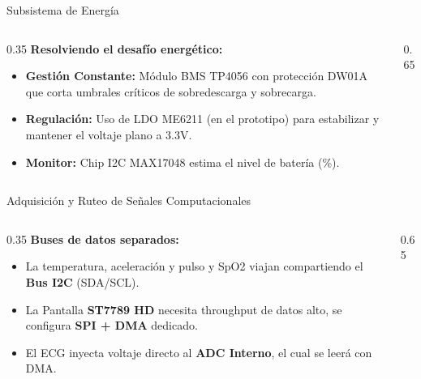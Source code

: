 \documentclass[aspectratio=169, 10pt]{beamer}
\begin{document}
\begin{frame}{Subsistema de Energía}
    \begin{columns}[c]
        \begin{column}{0.35\textwidth}
            \textbf{Resolviendo el desafío energético:}
            \begin{itemize}
                \item \textbf{Gestión Constante:} Módulo BMS TP4056 con protección DW01A que corta umbrales críticos de sobredescarga y sobrecarga.
                \item \textbf{Regulación:} Uso de LDO ME6211 (en el prototipo) para estabilizar y mantener el voltaje plano a 3.3V.
                \item \textbf{Monitor:} Chip I2C MAX17048 estima el nivel de batería (\%).
            \end{itemize}
        \end{column}
        \begin{column}{0.65\textwidth}
            \resizebox{\linewidth}{!}{}
        \end{column}
    \end{columns}
\end{frame}

\begin{frame}{Adquisición y Ruteo de Señales Computacionales}
    \begin{columns}[c]
        \begin{column}{0.35\textwidth}
            \textbf{Buses de datos separados:}
            \begin{itemize}
                \item La temperatura, aceleración y pulso y SpO2 viajan compartiendo el \textbf{Bus I2C} (SDA/SCL).
                \item La Pantalla \textbf{ST7789 HD} necesita throughput de datos alto, se configura \textbf{SPI + DMA} dedicado.
                \item El ECG inyecta voltaje directo al \textbf{ADC Interno}, el cual se leerá con DMA.
            \end{itemize}
        \end{column}
        \begin{column}{0.65\textwidth}
            \resizebox{\linewidth}{!}{}
        \end{column}
    \end{columns}
\end{frame}
\end{document}
